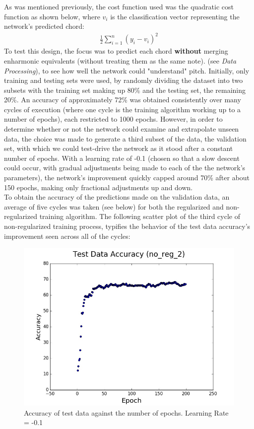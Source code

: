 \documentclass[a4paper]{article}
\begin{document}
As was mentioned previously, the cost function used was the quadratic cost function as shown below, where $v_i$ is the classification vector representing the network's predicted chord:
\begin{eqnarray}
\frac{1}{2}\sum_{i = 1}^n{(y_i - v_i)^2}
\end{eqnarray}
To test this design, the focus was to predict each chord \textbf{without} merging enharmonic equivalents (without treating them as the same note). (see \textit{Data Processing}), to see how well the network could "understand" pitch. Initially, only training and testing sets were used, by randomly dividing the dataset into two subsets with the training set making up 80\% and the testing set, the remaining 20\%. An accuracy of approximately 72\% was obtained consistently over many cycles of execution (where one cycle is the training algorithm working up to a number of epochs), each restricted to 1000 epochs. However, in order to determine whether or not the network could examine and extrapolate unseen data, the choice was made to generate a third subset of the data, the validation set, with which we could test-drive the network as it stood after a constant number of epochs. With a learning rate of -0.1 (chosen so that a slow descent could occur, with gradual adjustments being made to each of the the network's parameters), the network's improvement quickly capped around 70\% after about 150 epochs, making only fractional adjustments up and down.
\\[12pt]
To obtain the accuracy of the predictions made on the validation data, an average of five cycles was taken (see below) for both the regularized and non-regularized training algorithm. The following scatter plot of the third cycle of non-regularized training process, typifies the behavior of the test data accuracy's improvement seen across all of the cycles:
\\[12pt]
\begin{figure}[h]
\includegraphics[scale=0.2]{no_reg_2.jpg}
\caption{Accuracy of test data against the number of epochs. Learning Rate = -0.1}
\end{figure}
\end{document}
